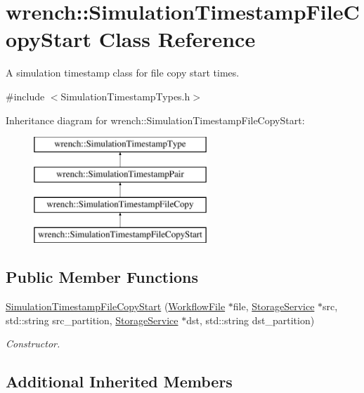 \hypertarget{classwrench_1_1_simulation_timestamp_file_copy_start}{}\section{wrench\+:\+:Simulation\+Timestamp\+File\+Copy\+Start Class Reference}
\label{classwrench_1_1_simulation_timestamp_file_copy_start}


A simulation timestamp class for file copy start times.  




{\ttfamily \#include $<$Simulation\+Timestamp\+Types.\+h$>$}

Inheritance diagram for wrench\+:\+:Simulation\+Timestamp\+File\+Copy\+Start\+:\begin{figure}[H]
\begin{center}
\leavevmode
\includegraphics[height=4.000000cm]{classwrench_1_1_simulation_timestamp_file_copy_start}
\end{center}
\end{figure}
\subsection*{Public Member Functions}
\begin{DoxyCompactItemize}
\item 
\hyperlink{classwrench_1_1_simulation_timestamp_file_copy_start_a6b9ed7566be611699102316ff8b711d7}{Simulation\+Timestamp\+File\+Copy\+Start} (\hyperlink{classwrench_1_1_workflow_file}{Workflow\+File} $\ast$file, \hyperlink{classwrench_1_1_storage_service}{Storage\+Service} $\ast$src, std\+::string src\+\_\+partition, \hyperlink{classwrench_1_1_storage_service}{Storage\+Service} $\ast$dst, std\+::string dst\+\_\+partition)
\begin{DoxyCompactList}\small\item\em Constructor. \end{DoxyCompactList}\end{DoxyCompactItemize}
\subsection*{Additional Inherited Members}


